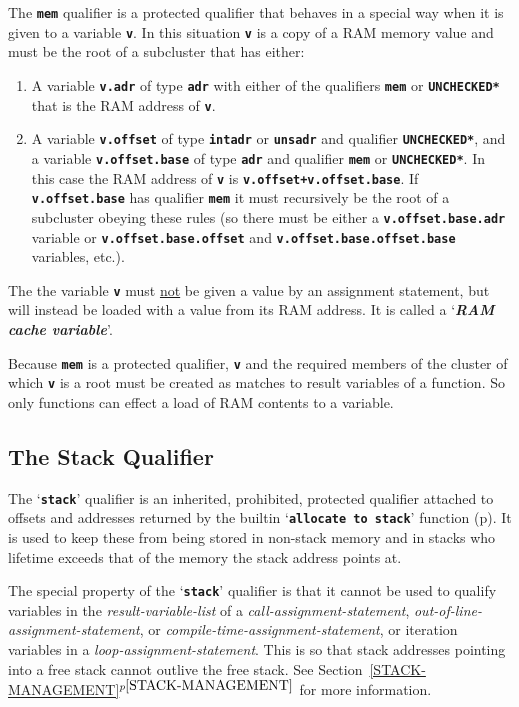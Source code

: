 \documentclass[12pt]{article}
\makeatletter
\newcommand{\TT}[1]{{\tt \bfseries #1}}
\newcommand{\key}[1]{{\bf \em #1}\index{#1}}
\newcommand{\ttkey}[1]{\TT{#1}\index{#1@{\tt #1}}}
\newcommand{\itemref}[1]{\ref{#1}$^{p\pageref{#1}}$}
\newcommand{\pagref}[1]{p\pageref{#1}}
\newcommand{\EOL}{\penalty \exhyphenpenalty}
\makeatother
\begin{document}
The \ttkey{mem} qualifier is a protected qualifier that behaves
in a special way when it is given to a variable \TT{v}.
In this situation \TT{v} is a copy of a RAM memory value and
must be the root of a subcluster that
has either:
\begin{enumerate}
\item
A variable \TT{v.adr} of type \TT{adr} with either of the qualifiers
\TT{mem} or \TT{*UNCHECKED*} that is the RAM address of \TT{v}.

\item
A variable \TT{v.offset} of type \TT{intadr} or \TT{unsadr} and
qualifier \TT{*UNCHECKED*}, and
a variable \TT{v.offset.base} of type \TT{adr} and qualifier \TT{mem}
or \TT{*UNCHECKED*}.
In this case the RAM address of \TT{v} is \TT{v.offset+v.offset.base}.
If \TT{v.offset.base} has qualifier \TT{mem} it must recursively be
the root of a subcluster obeying
these rules (so there must be either a \TT{v.offset.base.adr} variable
or \TT{v.offset.base.offset} and \TT{v.offset.base\EOL .offset.base}
variables, etc.).
\end{enumerate}
The the
variable \TT{v} must \underline{not} be given a value by an
assignment statement, but will instead be loaded with a value
from its RAM address.  It is called a `\key{RAM cache variable}'.

Because \TT{mem} is a protected qualifier, \TT{v} and the required
members of the cluster of which \TT{v} is a root
must be created as matches to result variables of a function.
So only functions can effect a load of RAM contents to a variable.


\subsection{The Stack Qualifier}
\label{THE-STACK-QUALIFIER}

The `\ttkey{stack}' qualifier is an inherited, prohibited,
protected qualifier
attached to offsets and addresses
returned by the builtin `\TT{allocate to stack}'
function (\pagref{ALLOCATE-TO-STACK}).
It is used to keep these from being stored in
non-stack memory and in stacks who lifetime exceeds that of the
memory the stack address points at.

The special property of the `\TT{stack}' qualifier is that it cannot
be used to qualify variables in the {\em result-variable-list}
of a {\em call-assignment-statement},
{\em out-of-line-assignment-statement}, or
{\em compile-time-assignment-statement},
or iteration variables in a {\em loop-assignment-statement}.
This is so that stack addresses pointing into a free stack
cannot outlive the free stack.
See Section~\itemref{STACK-MANAGEMENT} for more information.
\end{document}
